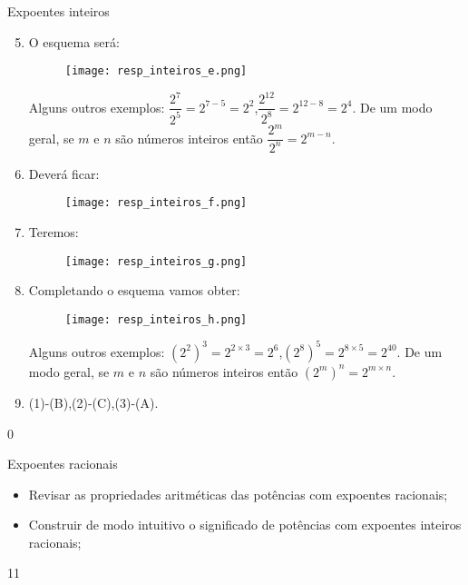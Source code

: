 \begin{answer}{Expoentes inteiros}
{
\begin{enumerate}\setcounter{enumi}{4}
\item
O esquema será:

\begin{figure}[H]
\centering
\noindent\texttt{[image: resp\_inteiros\_e.png]}
\end{figure}

Alguns outros exemplos: $\dfrac{2^7}{2^5} =2^{7-5}=2^2$,\quad $\dfrac{2^{12}}{2^8} =2^{12-8}=2^4$. De um modo geral, se $m$ e $n$ são números inteiros então $\dfrac{2^m}{2^n} =2^{m-n}$.

\item Deverá ficar:

\begin{figure}[H]
\centering
\noindent\texttt{[image: resp\_inteiros\_f.png]}
\end{figure}

\item Teremos:

\begin{figure}[H]
\centering
\noindent\texttt{[image: resp\_inteiros\_g.png]}
\end{figure}

\item Completando o esquema vamos obter:

\begin{figure}[H]
\centering
\noindent\texttt{[image: resp\_inteiros\_h.png]}
\end{figure}

Alguns outros exemplos: $(2^{2})^{3}=2^{2\times3}=2^6$,\quad $(2^{8})^{5}=2^{8\times5}=2^{40}$. De um modo geral, se $m$ e $n$ são números inteiros então $(2^{m})^{n}=2^{m \times n}$.

\item (1)-(B),\quad (2)-(C),\quad (3)-(A).
\end{enumerate}
}{0}
\end{answer}
\clearmargin
\begin{objectives}{Expoentes racionais}
{
\begin{itemize}
\item Revisar as propriedades aritméticas das potências com expoentes racionais;
\item Construir de modo intuitivo o significado de potências com expoentes inteiros racionais;

\end{itemize}
}{1}{1}
\end{objectives}

